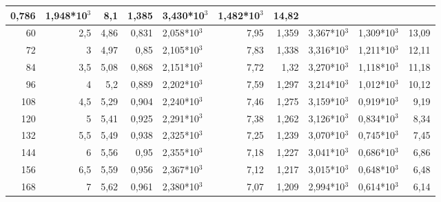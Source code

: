 \begin{table}[H]
{\begin{tabular}{|rr|rrl|rrl|l|r|}
  \multicolumn{1}{r|}{0,786} &
  1,948*10$^3$ &
  \multicolumn{1}{r|}{8,1} &
  \multicolumn{1}{r|}{1,385} &
  3,430*10$^3$ &
  1,482*10$^3$ &
  14,82 \\ \hline
\multicolumn{1}{|r|}{60} &
  2,5 &
  \multicolumn{1}{r|}{4,86} &
  \multicolumn{1}{r|}{0,831} &
  2,058*10$^3$ &
  \multicolumn{1}{r|}{7,95} &
  \multicolumn{1}{r|}{1,359} &
  3,367*10$^3$ &
  1,309*10$^3$ &
  13,09 \\ \hline
\multicolumn{1}{|r|}{72} &
  3 &
  \multicolumn{1}{r|}{4,97} &
  \multicolumn{1}{r|}{0,85} &
  2,105*10$^3$ &
  \multicolumn{1}{r|}{7,83} &
  \multicolumn{1}{r|}{1,338} &
  3,316*10$^3$ &
  1,211*10$^3$ &
  12,11 \\ \hline
\multicolumn{1}{|r|}{84} &
  3,5 &
  \multicolumn{1}{r|}{5,08} &
  \multicolumn{1}{r|}{0,868} &
  2,151*10$^3$ &
  \multicolumn{1}{r|}{7,72} &
  \multicolumn{1}{r|}{1,32} &
  3,270*10$^3$ &
  1,118*10$^3$ &
  11,18 \\ \hline
\multicolumn{1}{|r|}{96} &
  4 &
  \multicolumn{1}{r|}{5,2} &
  \multicolumn{1}{r|}{0,889} &
  2,202*10$^3$ &
  \multicolumn{1}{r|}{7,59} &
  \multicolumn{1}{r|}{1,297} &
  3,214*10$^3$ &
  1,012*10$^3$ &
  10,12 \\ \hline
\multicolumn{1}{|r|}{108} &
  4,5 &
  \multicolumn{1}{r|}{5,29} &
  \multicolumn{1}{r|}{0,904} &
  2,240*10$^3$ &
  \multicolumn{1}{r|}{7,46} &
  \multicolumn{1}{r|}{1,275} &
  3,159*10$^3$ &
  0,919*10$^3$ &
  9,19 \\ \hline
\multicolumn{1}{|r|}{120} &
  5 &
  \multicolumn{1}{r|}{5,41} &
  \multicolumn{1}{r|}{0,925} &
  2,291*10$^3$ &
  \multicolumn{1}{r|}{7,38} &
  \multicolumn{1}{r|}{1,262} &
  3,126*10$^3$ &
  0,834*10$^3$ &
  8,34 \\ \hline
\multicolumn{1}{|r|}{132} &
  5,5 &
  \multicolumn{1}{r|}{5,49} &
  \multicolumn{1}{r|}{0,938} &
  2,325*10$^3$ &
  \multicolumn{1}{r|}{7,25} &
  \multicolumn{1}{r|}{1,239} &
  3,070*10$^3$ &
  0,745*10$^3$ &
  7,45 \\ \hline
\multicolumn{1}{|r|}{144} &
  6 &
  \multicolumn{1}{r|}{5,56} &
  \multicolumn{1}{r|}{0,95} &
  2,355*10$^3$ &
  \multicolumn{1}{r|}{7,18} &
  \multicolumn{1}{r|}{1,227} &
  3,041*10$^3$ &
  0,686*10$^3$ &
  6,86 \\ \hline
\multicolumn{1}{|r|}{156} &
  6,5 &
  \multicolumn{1}{r|}{5,59} &
  \multicolumn{1}{r|}{0,956} &
  2,367*10$^3$ &
  \multicolumn{1}{r|}{7,12} &
  \multicolumn{1}{r|}{1,217} &
  3,015*10$^3$ &
  0,648*10$^3$ &
  6,48 \\ \hline
\multicolumn{1}{|r|}{168} &
  7 &
  \multicolumn{1}{r|}{5,62} &
  \multicolumn{1}{r|}{0,961} &
  2,380*10$^3$ &
  \multicolumn{1}{r|}{7,07} &
  \multicolumn{1}{r|}{1,209} &
  2,994*10$^3$ &
  0,614*10$^3$ &
  6,14 \\ \hline
\end{tabular}%
}
\end{table}


